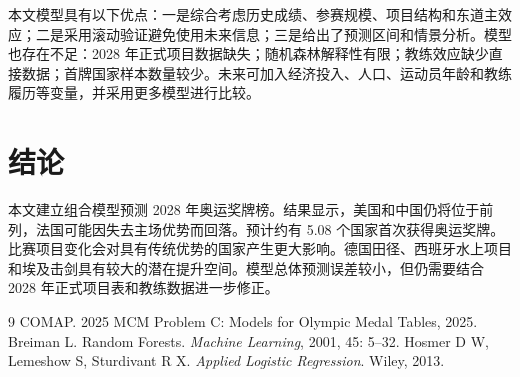 \documentclass[UTF8,11pt,a4paper]{ctexart}
\begin{document}
本文模型具有以下优点：一是综合考虑历史成绩、参赛规模、项目结构和东道主效应；二是采用滚动验证避免使用未来信息；三是给出了预测区间和情景分析。模型也存在不足：2028 年正式项目数据缺失；随机森林解释性有限；教练效应缺少直接数据；首牌国家样本数量较少。未来可加入经济投入、人口、运动员年龄和教练履历等变量，并采用更多模型进行比较。

\section{结论}

本文建立组合模型预测 2028 年奥运奖牌榜。结果显示，美国和中国仍将位于前列，法国可能因失去主场优势而回落。预计约有 5.08 个国家首次获得奥运奖牌。比赛项目变化会对具有传统优势的国家产生更大影响。德国田径、西班牙水上项目和埃及击剑具有较大的潜在提升空间。模型总体预测误差较小，但仍需要结合 2028 年正式项目表和教练数据进一步修正。

\begin{thebibliography}{9}
 COMAP. 2025 MCM Problem C: Models for Olympic Medal Tables, 2025.
 Breiman L. Random Forests. \emph{Machine Learning}, 2001, 45: 5--32.
 Hosmer D W, Lemeshow S, Sturdivant R X. \emph{Applied Logistic Regression}. Wiley, 2013.
\end{thebibliography}
\end{document}
